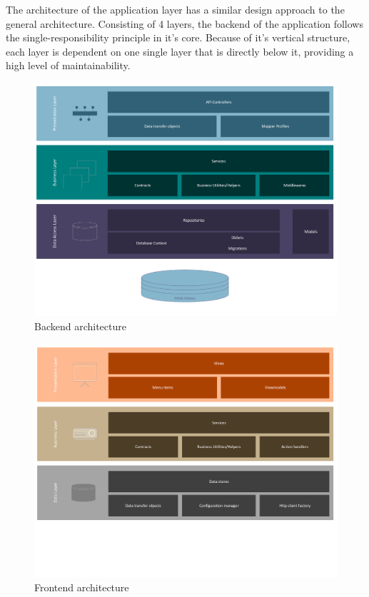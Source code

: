 The architecture of the application layer has a similar design approach to the general architecture.
Consisting of 4 layers, the backend of the application follows the single-responsibility principle in it's core.
Because of it's vertical structure, each layer is dependent on one single layer that is directly below it, providing a high level
of maintainability.

\begin{figure}[H]
	\centering
	\includegraphics[scale=0.57]{backend-architecture}
	\caption{Backend architecture}
\end{figure}

\begin{figure}[H]
	\centering
	\includegraphics[scale=0.57]{frontend-architecture}
	\caption{Frontend architecture}
\end{figure}

